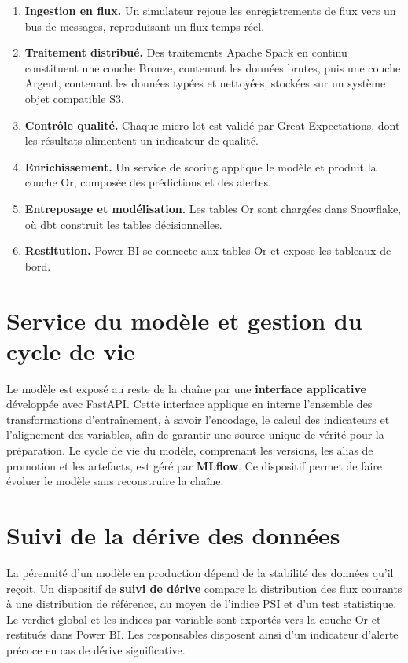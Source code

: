 \documentclass[12pt,a4paper,oneside]{report}
\begin{document}
\begin{enumerate}[leftmargin=1.6em]
  \item \textbf{Ingestion en flux.} Un simulateur rejoue les enregistrements de flux vers un bus de messages, reproduisant un flux temps réel.
  \item \textbf{Traitement distribué.} Des traitements Apache Spark en continu constituent une couche Bronze, contenant les données brutes, puis une couche Argent, contenant les données typées et nettoyées, stockées sur un système objet compatible S3.
  \item \textbf{Contrôle qualité.} Chaque micro-lot est validé par Great Expectations, dont les résultats alimentent un indicateur de qualité.
  \item \textbf{Enrichissement.} Un service de scoring applique le modèle et produit la couche Or, composée des prédictions et des alertes.
  \item \textbf{Entreposage et modélisation.} Les tables Or sont chargées dans Snowflake, où dbt construit les tables décisionnelles.
  \item \textbf{Restitution.} Power BI se connecte aux tables Or et expose les tableaux de bord.
\end{enumerate}

\section{Service du modèle et gestion du cycle de vie}
Le modèle est exposé au reste de la chaîne par une \textbf{interface applicative} développée avec FastAPI. Cette interface applique en interne l'ensemble des transformations d'entraînement, à savoir l'encodage, le calcul des indicateurs et l'alignement des variables, afin de garantir une source unique de vérité pour la préparation. Le cycle de vie du modèle, comprenant les versions, les alias de promotion et les artefacts, est géré par \textbf{MLflow}. Ce dispositif permet de faire évoluer le modèle sans reconstruire la chaîne.

\section{Suivi de la dérive des données}
La pérennité d'un modèle en production dépend de la stabilité des données qu'il reçoit. Un dispositif de \textbf{suivi de dérive} compare la distribution des flux courants à une distribution de référence, au moyen de l'indice PSI et d'un test statistique. Le verdict global et les indices par variable sont exportés vers la couche Or et restitués dans Power BI. Les responsables disposent ainsi d'un indicateur d'alerte précoce en cas de dérive significative.
\end{document}
